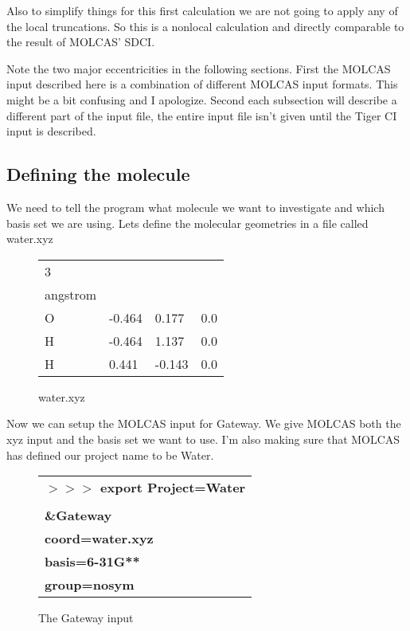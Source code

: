 \documentclass{article}
\begin{document}
Also to simplify things for this first calculation we are not going to apply any of the local truncations. So this is a nonlocal calculation and directly comparable to the result of MOLCAS' SDCI.

Note the two major eccentricities in the following sections. First the MOLCAS input described here is a combination of different MOLCAS input formats. This might be a bit confusing and I apologize. Second each subsection will describe a different part of the input file, the entire input file isn't given until the Tiger CI input is described.

\subsection{Defining the molecule}
We need to tell the program what molecule we want to investigate and which basis set we are using. Lets define the molecular geometries in a file called water.xyz

\begin{figure}[h!]
	\centering
	\begin{tabular} {l l l l}
		3 \\
		angstrom \\
		O&     -0.464 &     0.177  &   0.0 \\ 
		H&     -0.464 &     1.137  &   0.0 \\
		H&    0.441   &     -0.143 &    0.0 \\
	\end{tabular}
	\caption{water.xyz}
\end{figure}

Now we can setup the MOLCAS input for Gateway. We give MOLCAS both the xyz input and the basis set we want to use. I'm also making sure that MOLCAS has defined our project name to be Water.

\begin{figure}[h!]
	\begin{tabular}{l}
	        \textbf{$>>>$ export Project=Water} \\
	        \textbf{ } \\
		\textbf{\&Gateway} \\
		\textbf{coord=water.xyz} \\
		\textbf{basis=6-31G**} \\
		\textbf{group=nosym} \\
	\end{tabular}
	\centering
	\caption{The Gateway input}
\end{figure}
\end{document}
